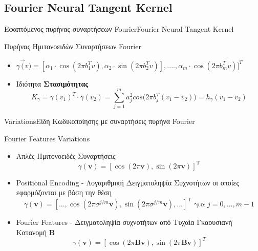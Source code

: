 \documentclass[10pt]{beamer}
\begin{document}
\subsection{Fourier Neural Tangent Kernel}
\begin{frame}{Εφαπτόμενος πυρήνας συναρτήσεων Fourier}{Fourier Neural Tangent Kernel}

\begin{block}{Πυρήνας Ημιτονοειδών Συναρτήσεων Fourier}

\begin{itemize}
    \item $\gamma\vec(v) = [\alpha_1\cdot\cos(2 \pi b_1^{T}v), \alpha_2\cdot\sin(2\pi b_2^{T}v)],....,\alpha_m\cdot\cos(2\pi b_m^{T}v)]^{T} $
    \item  Ιδιότητα \textbf{Στασιμότητας} $$K_{\gamma} = \gamma(v_1)^{T}\cdot \gamma(v_2) = \sum_{j=1}^{m}{a^2_{j}cos(2\pi b_j^{T}(v_1 - v_2)}) = h_{\gamma}(v_1-v_2)$$
\end{itemize}
\end{block}
\end{frame}
\begin{frame}{Variations}{Είδη Κωδικοποίησης με συναρτήσεις πυρήνα Fourier}
    \begin{block}{Fourier Features Variations}
    \begin{itemize}
        \item Απλές Ημιτονοειδές Συναρτήσεις \[ \gamma(\mathbf{v})=\left[\cos(2\pi\mathbf{v}), \sin(2\pi\mathbf{v})\right]^{\mathrm{T}}\]
        \item Positional Encoding - Λογαριθμική Δειγματοληψία Συχνοτήτων οι οποίες εφαρμόζονται με βάση την θέση
        \[
            \gamma(\mathbf{v})=\left[\ldots, \cos \left(2 \pi \sigma^{j / m} \mathbf{v}\right), \sin \left(2 \pi \sigma^{j / m} \mathbf{v}\right), \ldots\right]^{\mathrm{T}} \text { για } j=0, \ldots, m-1
        \]
        \item Fourier Features - Δειγματοληψία συχνοτήτων από Τυχαία Γκαουσιανή Κατανομή \textbf{Β}
       \[
            \gamma(\mathbf{v})=[\cos (2 \pi \mathbf{B} \mathbf{v}), \sin (2 \pi \mathbf{B} \mathbf{v})]^{T}
        \]
    \end{itemize}
    \end{block}
\end{frame}
\end{document}
